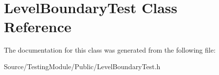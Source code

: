 \hypertarget{class_level_boundary_test}{}\section{Level\+Boundary\+Test Class Reference}
\label{class_level_boundary_test}


The documentation for this class was generated from the following file\+:\begin{DoxyCompactItemize}
\item 
Source/\+Testing\+Module/\+Public/Level\+Boundary\+Test.\+h\end{DoxyCompactItemize}

